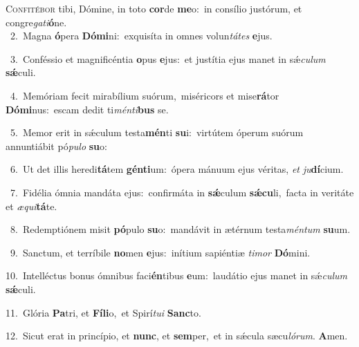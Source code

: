 \lettrine{\initial\textcolor{\initialcolor}{C}}{onfitébor} tibi, Dómine, in toto \textbf{cor}\-de \textbf{me}\-o:~\star in consílio justórum, et congre\-\textit{ga}\-\textit{ti}\textbf{ó}ne.\\
{\numbfont\textcolor{\numbcolor}{~2.}}~Magna \textbf{ó}\-pera \textbf{Dó}\-\textbf{mi}ni:~\star exquisíta in omnes volun\-\textit{tá}\-\textit{tes} \textbf{e}\-jus.\par
{\numbfont\textcolor{\numbcolor}{~3.}}~Conféssio et magnificéntia \textbf{o}\-pus \textbf{e}\-jus:~\star et justítia ejus manet in sǽ\-\textit{cu}\-\textit{lum} \textbf{sǽ}\-culi.\par
{\numbfont\textcolor{\numbcolor}{~4.}}~Memóriam fecit mirabílium suórum,~\dagger miséricors et mise\-\textbf{rá}\-tor \textbf{Dó}\-\textbf{mi}nus:~\star escam dedit ti\-\textit{mén}\-\textit{ti}\textbf{bus} se.\par
{\numbfont\textcolor{\numbcolor}{~5.}}~Memor erit in sǽculum testa\-\textbf{mén}\-ti \textbf{su}\-i:~\star virtútem óperum suórum annuntiábit pó\-\textit{pu}\-\textit{lo} \textbf{su}\-o:\par
{\numbfont\textcolor{\numbcolor}{~6.}}~Ut det illis heredi\-\textbf{tá}\-tem \textbf{gén}\-\textbf{ti}um:~\star ópera mánuum ejus véritas, \textit{et} \textit{ju}\-\textbf{dí}cium.\par
{\numbfont\textcolor{\numbcolor}{~7.}}~Fidélia ómnia mandáta ejus:~\dagger confirmáta in \textbf{sǽ}\-culum \textbf{sǽ}\-\textbf{cu}li,~\star facta in veritáte et \textit{æ}\-\textit{qui}\textbf{tá}te.\par
{\numbfont\textcolor{\numbcolor}{~8.}}~Redemptiónem misit \textbf{pó}\-pulo \textbf{su}\-o:~\star mandávit in ætérnum testa\-\textit{mén}\-\textit{tum} \textbf{su}\-um.\par
{\numbfont\textcolor{\numbcolor}{~9.}}~Sanctum, et terríbile \textbf{no}\-men \textbf{e}\-jus:~\star inítium sapiéntiæ \textit{ti}\-\textit{mor} \textbf{Dó}\-mini.\par
{\numbfont\textcolor{\numbcolor}{10.}}~Intelléctus bonus ómnibus faci\-\textbf{én}\-tibus \textbf{e}\-um:~\star laudátio ejus manet in sǽ\-\textit{cu}\-\textit{lum} \textbf{sǽ}\-culi.\par
{\numbfont\textcolor{\numbcolor}{11.}}~Glória \textbf{Pa}\-tri, et \textbf{Fí}\-\textbf{li}o,~\star et Spirí\-\textit{tu}\-\textit{i} \textbf{Sanc}\-to.\par
{\numbfont\textcolor{\numbcolor}{12.}}~Sicut erat in princípio, et \textbf{nunc}\-, et \textbf{sem}\-per,~\star et in sǽcula sæcu\-\textit{ló}\-\textit{rum}. \textbf{A}\-men.\par
